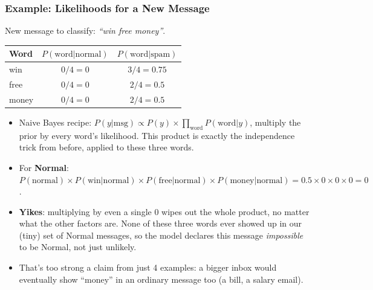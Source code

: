 \begin{frame}[fragile]\frametitle{Example: Likelihoods for a New Message}
New message to classify: \emph{``win free money''}.
\begin{center}
\begin{tabular}{l|c|c}
\textbf{Word} & \textbf{$P(\text{word}|\text{normal})$} & \textbf{$P(\text{word}|\text{spam})$} \\ \hline
win   & $0/4 = 0$ & $3/4 = 0.75$ \\
free  & $0/4 = 0$ & $2/4 = 0.5$ \\
money & $0/4 = 0$ & $2/4 = 0.5$
\end{tabular}
\end{center}
\begin{itemize}
\item Naive Bayes recipe: $P(y|\text{msg}) \propto P(y) \times \prod_{\text{word}} P(\text{word}|y)$, multiply the prior by every word's likelihood. This product is exactly the independence trick from before, applied to these three words.
\item For \textbf{Normal}: $P(\text{normal})\times P(\text{win}|\text{normal})\times P(\text{free}|\text{normal})\times P(\text{money}|\text{normal}) = 0.5\times0\times0\times0=0$.
\item \textbf{Yikes}: multiplying by even a single $0$ wipes out the whole product, no matter what the other factors are. None of these three words ever showed up in our (tiny) set of Normal messages, so the model declares this message \emph{impossible} to be Normal, not just unlikely.
\item That's too strong a claim from just 4 examples: a bigger inbox would eventually show ``money'' in an ordinary message too (a bill, a salary email).
\end{itemize}
\end{frame}

